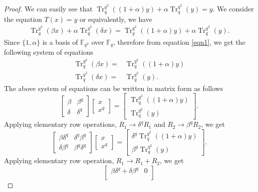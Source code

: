 \documentclass{birkjour}
\theoremstyle{definition}
\theoremstyle{remark}
\numberwithin{equation}{section}
\begin{document}
	\begin{proof}
		We can easily see that $\operatorname{Tr}_{q}^{q^2}((1+\alpha)y)+\alpha\operatorname{Tr}_{q}^{q^2}(y)=y$. We consider the equation $T(x)=y$ or equivalently, we have 
		\begin{align}\label{eqn1}
			\operatorname{Tr}_{q}^{q^2}(\beta x)+\alpha\operatorname{Tr}_{q}^{q^2}(\delta x)=\operatorname{Tr}_{q}^{q^2}((1+\alpha)y)+\alpha\operatorname{Tr}_{q}^{q^2}(y).
		\end{align}
	Since $\{1, \alpha\}$ is a basis of $\mathbb{F}_{q^2}$ over $\mathbb{F}_{q}$, therefore from equation \ref{eqn1}, we get the following system of equations
	\begin{align*}
		\operatorname{Tr}_{q}^{q^2}(\beta x)=&\operatorname{Tr}_{q}^{q^2}((1+\alpha)y)\\
		\operatorname{Tr}_{q}^{q^2}(\delta x)=&\operatorname{Tr}_{q}^{q^2}(y).
	\end{align*}
The above system of equations can be written in matrix form as follows
	$$\begin{bmatrix}
		\beta&\beta^{q}\\
		\delta&\delta^{q}
	\end{bmatrix}
	\begin{bmatrix}
		x\\x^{q}
	\end{bmatrix}
	=\begin{bmatrix}
		\operatorname{Tr}_{q}^{q^2}((1+\alpha)y)\\\operatorname{Tr}_{q}^{q^2}(y)
	\end{bmatrix}.$$
	Applying elementary row operations, $R_1\rightarrow \delta^{q}R_1$ and $R_2\rightarrow \beta^{q}R_2$, we get\\
	\[\begin{bmatrix}
		\beta\delta^{q}&\delta^{q}\beta^{q}\\
		\delta\beta^{q}&\beta^{q}\delta^{q}
	\end{bmatrix}
	\begin{bmatrix}	
			x\\x^{q}
	\end{bmatrix}
	=\begin{bmatrix}
		\delta^{q}\operatorname{Tr}_{q}^{q^2}((1+\alpha)y)\\\beta^{q}\operatorname{Tr}_{q}^{q^2}(y)
	\end{bmatrix}.\]
	Applying elementary row operation, $R_1\rightarrow R_1+R_2$, we get\\
	\[\begin{bmatrix}
		\beta\delta^{q}+\delta\beta^{q}&0\\

\end{bmatrix}\]
\end{proof}
\end{document}
